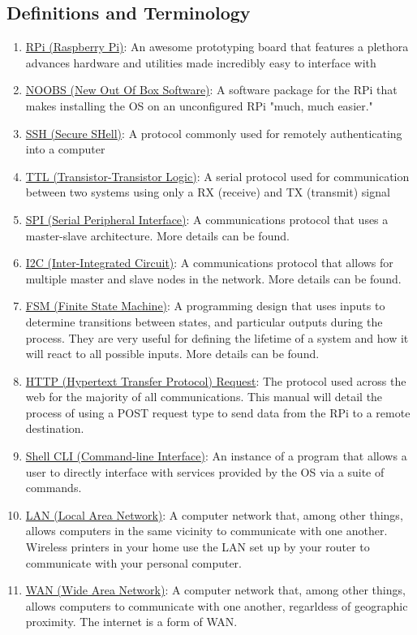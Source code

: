 \documentclass{article}
\newcommand{\createterm}[3]{
      \item \href{#1}{#2}: #3
} %
\begin{document}
  \subsection{Definitions and Terminology}
    \begin{enumerate}
      \createterm{https://en.wikipedia.org/wiki/Raspberry\_Pi}{RPi (Raspberry Pi)}{An awesome prototyping board that features a plethora advances hardware and utilities made incredibly easy to interface with}
      \createterm{https://www.raspberrypi.org/blog/introducing-noobs/}{NOOBS (New Out Of Box Software)}{A software package for the RPi that makes installing the OS on an unconfigured RPi "much, much easier."}
      \createterm{https://en.wikipedia.org/wiki/Secure\_Shell}{SSH (Secure SHell)}{A protocol commonly used for remotely authenticating into a computer}
      \createterm{https://en.wikipedia.org/wiki/Transistor\%E2\%80\%93transistor\_logic}{TTL (Transistor-Transistor Logic)}{A serial protocol used for communication between two systems using only a RX (receive) and TX (transmit) signal}
      \createterm{https://en.wikipedia.org/wiki/Serial\_Peripheral\_Interface\_Bus}{SPI (Serial Peripheral Interface)}{A communications protocol that uses a master-slave architecture. More details can be found.}
      \createterm{https://en.wikipedia.org/wiki/I\%C2\%B2C}{I2C (Inter-Integrated Circuit)}{A communications protocol that allows for multiple master and slave nodes in the network. More details can be found.}
      \createterm{https://en.wikipedia.org/wiki/Finite-state\_machine}{FSM (Finite State Machine)}{A programming design that uses inputs to determine transitions between states, and particular outputs during the process. They are very useful for defining the lifetime of a system and how it will react to all possible inputs. More details can be found.}
      \createterm{https://en.wikipedia.org/wiki/Hypertext\_Transfer\_Protocol\#Request\_methods}{HTTP (Hypertext Transfer Protocol) Request}{The protocol used across the web for the majority of all communications. This manual will detail the process of using a POST request type to send data from the RPi to a remote destination.}
      \createterm{https://en.wikipedia.org/wiki/Command-line\_interface}{Shell CLI (Command-line Interface)}{An instance of a program that allows a user to directly interface with services provided by the OS via a suite of commands.}
      \createterm{https://en.wikipedia.org/wiki/Local\_area\_network}{LAN (Local Area Network)}{A computer network that, among other things, allows computers in the same vicinity to communicate with one another. Wireless printers in your home use the LAN set up by your router to communicate with your personal computer.}
      \createterm{https://en.wikipedia.org/wiki/Wide\_area\_network}{WAN (Wide Area Network)}{A computer network that, among other things, allows computers to communicate with one another, regarldess of geographic proximity. The internet is a form of WAN.}
    \end{enumerate}
\end{document}
